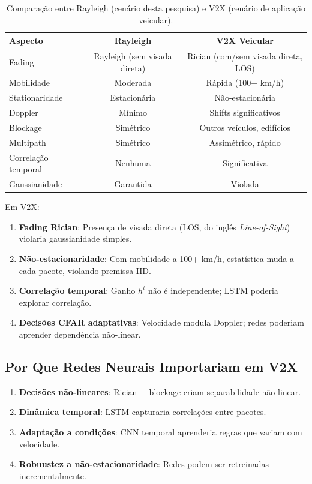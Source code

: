 \documentclass{sbrt}
\begin{document}
\begin{table}[H]
\centering
\begin{tabular}{lcc}
\toprule
\textbf{Aspecto} & \textbf{Rayleigh} & \textbf{V2X Veicular} \\
\midrule
Fading & Rayleigh (sem visada direta) & Rician (com/sem visada direta, LOS) \\
Mobilidade & Moderada & Rápida (100+ km/h) \\
Stationaridade & Estacionária & Não-estacionária \\
Doppler & Mínimo & Shifts significativos \\
Blockage & Simétrico & Outros veículos, edifícios \\
Multipath & Simétrico & Assimétrico, rápido \\
Correlação temporal & Nenhuma & Significativa \\
Gaussianidade & Garantida & Violada \\
\bottomrule
\end{tabular}
\caption{Comparação entre Rayleigh (cenário desta pesquisa) e V2X (cenário de aplicação veicular).}
\label{tab:rayleigh_vs_v2x}
\end{table}

Em V2X:
\begin{enumerate}
\item \textbf{Fading Rician}: Presença de visada direta (LOS, do inglês \textit{Line-of-Sight}) violaria gaussianidade simples.
\item \textbf{Não-estacionaridade}: Com mobilidade a 100+ km/h, estatística muda a cada pacote, violando premissa IID.
\item \textbf{Correlação temporal}: Ganho $h^i$ não é independente; LSTM poderia explorar correlação.
\item \textbf{Decisões CFAR adaptativas}: Velocidade modula Doppler; redes poderiam aprender dependência não-linear.
\end{enumerate}

\subsection{Por Que Redes Neurais Importariam em V2X}

\begin{enumerate}
\item \textbf{Decisões não-lineares}: Rician + blockage criam separabilidade não-linear.
\item \textbf{Dinâmica temporal}: LSTM capturaria correlações entre pacotes.
\item \textbf{Adaptação a condições}: CNN temporal aprenderia regras que variam com velocidade.
\item \textbf{Robuustez a não-estacionaridade}: Redes podem ser retreinadas incrementalmente.
\end{enumerate}
\end{document}
